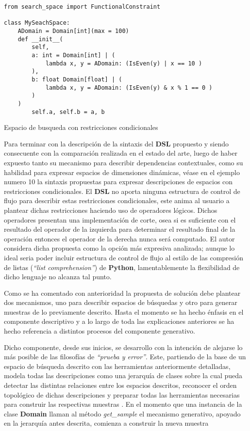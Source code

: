 \begin{listing}[!ht]
    \begin{verbatim}
from search_space import FunctionalConstraint

class MySeachSpace:
    ADomain = Domain[int](max = 100)
    def __init__(
        self, 
        a: int = Domain[int] | (
            lambda x, y = ADomain: (IsEven(y) | x == 10 )
        ),
        b: float Domain[float] | (
            lambda x, y = ADomain: (IsEven(y) & x % 1 == 0 )
        )             
    )
        self.a, self.b = a, b

    \end{verbatim}
    \caption{Espacio de busqueda con restricciones condicionales}
    \label{ex:class_cond}
\end{listing}

Para terminar con la descripción de la sintaxis del {\bf DSL} propuesto y siendo consecuente con la comparación realizada
en el estado del arte, luego de haber expuesto tanto su mecanismo para describir dependencias contextuales, como su
habilidad para expresar espacios de dimensiones dinámicas, véase en el ejemplo numero 10 la sintaxis propuestas para
expresar descripciones de espacios con restricciones condicionales. El {\bf DSL} no aporta ninguna estructura de control
de flujo para describir estas restricciones condicionales, este anima al usuario a plantear dichas restricciones
haciendo uso de operadores lógicos. Dichos operadores presentan una implementación de corte, osea si es suficiente
con el resultado del operador de la izquierda para determinar el resultado final de la operación entonces el operador
de la derecha nunca será computado. El autor considera dicha propuesta como la opción más expresiva analizada; aunque
lo ideal seria poder incluir estructura de control de flujo al estilo de las compresión de listas  ({\it “list comprehension”})
de {\bf Python}, lamentablemente la flexibilidad de dicho lenguaje no alcanza tal punto.

Como se ha comentado con anterioridad la propuesta de solución debe plantear dos mecanismos, uno para describir espacios
de búsquedas y otro para generar muestras de lo previamente descrito. Hasta el momento se ha hecho énfasis en el componente
descriptivo y a lo largo de toda las explicaciones anteriores se ha hecho referencia a distintos procesos del componente generativo.

Dicho componente, desde sus inicios, se desarrollo con la intención de alejarse lo más posible de las filosofías de
    {\it “prueba y error”}. Este, partiendo de la base de un espacio de búsqueda descrito con las herramientas anteriormente
detalladas, modela todas las descripciones como una jerarquía de clases sobre la cual pueda detectar las distintas
relaciones entre los espacios descritos, reconocer el orden topológico de dichas descripciones y preparar todas las
herramientas necesarias para construir las respectivas muestras . En el momento que una instancia de la
clase {\bf Domain} llaman al método {\it get\_sample} el mecanismo generativo, apoyado en la jerarquía antes descrita, comienza
a construir la nueva muestra

